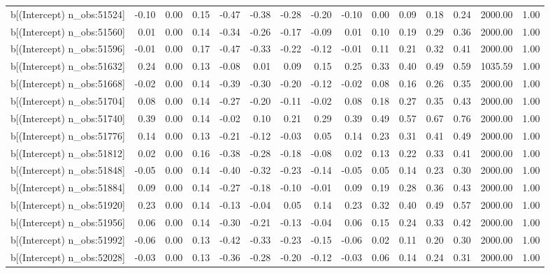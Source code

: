 \begin{table}[ht]
\begin{tabular}{rrrrrrrrrrrrrrr}
  b[(Intercept) n\_obs:51524] & -0.10 & 0.00 & 0.15 & -0.47 & -0.38 & -0.28 & -0.20 & -0.10 & 0.00 & 0.09 & 0.18 & 0.24 & 2000.00 & 1.00 \\ 
  b[(Intercept) n\_obs:51560] & 0.01 & 0.00 & 0.14 & -0.34 & -0.26 & -0.17 & -0.09 & 0.01 & 0.10 & 0.19 & 0.29 & 0.36 & 2000.00 & 1.00 \\ 
  b[(Intercept) n\_obs:51596] & -0.01 & 0.00 & 0.17 & -0.47 & -0.33 & -0.22 & -0.12 & -0.01 & 0.11 & 0.21 & 0.32 & 0.41 & 2000.00 & 1.00 \\ 
  b[(Intercept) n\_obs:51632] & 0.24 & 0.00 & 0.13 & -0.08 & 0.01 & 0.09 & 0.15 & 0.25 & 0.33 & 0.40 & 0.49 & 0.59 & 1035.59 & 1.00 \\ 
  b[(Intercept) n\_obs:51668] & -0.02 & 0.00 & 0.14 & -0.39 & -0.30 & -0.20 & -0.12 & -0.02 & 0.08 & 0.16 & 0.26 & 0.35 & 2000.00 & 1.00 \\ 
  b[(Intercept) n\_obs:51704] & 0.08 & 0.00 & 0.14 & -0.27 & -0.20 & -0.11 & -0.02 & 0.08 & 0.18 & 0.27 & 0.35 & 0.43 & 2000.00 & 1.00 \\ 
  b[(Intercept) n\_obs:51740] & 0.39 & 0.00 & 0.14 & -0.02 & 0.10 & 0.21 & 0.29 & 0.39 & 0.49 & 0.57 & 0.67 & 0.76 & 2000.00 & 1.00 \\ 
  b[(Intercept) n\_obs:51776] & 0.14 & 0.00 & 0.13 & -0.21 & -0.12 & -0.03 & 0.05 & 0.14 & 0.23 & 0.31 & 0.41 & 0.49 & 2000.00 & 1.00 \\ 
  b[(Intercept) n\_obs:51812] & 0.02 & 0.00 & 0.16 & -0.38 & -0.28 & -0.18 & -0.08 & 0.02 & 0.13 & 0.22 & 0.33 & 0.41 & 2000.00 & 1.00 \\ 
  b[(Intercept) n\_obs:51848] & -0.05 & 0.00 & 0.14 & -0.40 & -0.32 & -0.23 & -0.14 & -0.05 & 0.05 & 0.14 & 0.23 & 0.30 & 2000.00 & 1.00 \\ 
  b[(Intercept) n\_obs:51884] & 0.09 & 0.00 & 0.14 & -0.27 & -0.18 & -0.10 & -0.01 & 0.09 & 0.19 & 0.28 & 0.36 & 0.43 & 2000.00 & 1.00 \\ 
  b[(Intercept) n\_obs:51920] & 0.23 & 0.00 & 0.14 & -0.13 & -0.04 & 0.05 & 0.14 & 0.23 & 0.32 & 0.40 & 0.49 & 0.57 & 2000.00 & 1.00 \\ 
  b[(Intercept) n\_obs:51956] & 0.06 & 0.00 & 0.14 & -0.30 & -0.21 & -0.13 & -0.04 & 0.06 & 0.15 & 0.24 & 0.33 & 0.42 & 2000.00 & 1.00 \\ 
  b[(Intercept) n\_obs:51992] & -0.06 & 0.00 & 0.13 & -0.42 & -0.33 & -0.23 & -0.15 & -0.06 & 0.02 & 0.11 & 0.20 & 0.30 & 2000.00 & 1.00 \\ 
  b[(Intercept) n\_obs:52028] & -0.03 & 0.00 & 0.13 & -0.36 & -0.28 & -0.20 & -0.12 & -0.03 & 0.06 & 0.14 & 0.24 & 0.31 & 2000.00 & 1.00 \\ 

\end{tabular}
\end{table}
